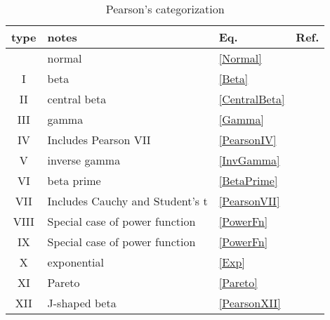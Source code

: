\begin{table}
\begin{center}
\caption{Pearson's categorization}
\label{PearsonTypesTable}
\begin{tabular}{clll}
\\
type & notes & Eq. & Ref.\\
\hline
 & normal & \eqref{Normal} & \cite{Pearson1895}  \\
I  & beta & \eqref{Beta} & \cite{Pearson1895}  \\
II &  central beta & \eqref{CentralBeta} & \cite{Pearson1895}  \\
III  &   gamma & \eqref{Gamma}& \cite{Pearson1893}  \\
IV  & Includes Pearson VII & \eqref{PearsonIV}& \cite{Pearson1895}  \\
V   &  inverse gamma & \eqref{InvGamma}& \cite{Pearson1901}  \\
VI   & beta prime &  \eqref{BetaPrime} & \cite{Pearson1901}  \\
VII   & Includes Cauchy and Student's t  &\eqref{PearsonVII} & \cite{Pearson1916}  \\ 
VIII   & Special case of power function & \eqref{PowerFn} & \cite{Pearson1916}  \\
IX  & Special case of power function & \eqref{PowerFn} & \cite{Pearson1916}  \\
X   & exponential & \eqref{Exp} & \cite{Pearson1916}  \\
XI   & Pareto & \eqref{Pareto} & \cite{Pearson1916}  \\
XII   & J-shaped beta  &\eqref{PearsonXII} & \cite{Pearson1916}  \\
\end{tabular}
\end{center}
\end{table}




